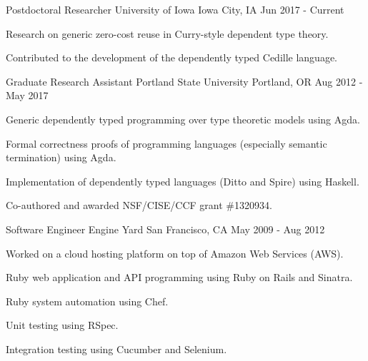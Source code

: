 

\begin{cventries}

  \cventry
    {Postdoctoral Researcher} %
    {University of Iowa} %
    {Iowa City, IA} %
    {Jun 2017 - Current} %
    {
      \begin{cvitems} %
        \item {Research on generic zero-cost reuse in Curry-style dependent type theory.}
        \item {Contributed to the development of the dependently typed Cedille language.}
      \end{cvitems}
    }

  \cventry
    {Graduate Research Assistant} %
    {Portland State University} %
    {Portland, OR} %
    {Aug 2012 - May 2017} %
    {
      \begin{cvitems} %
        \item {Generic dependently typed programming over type theoretic models using Agda.}
        \item {Formal correctness proofs of programming languages (especially semantic termination) using Agda.}
        \item {Implementation of dependently typed languages (Ditto and Spire) using Haskell.}
        \item {Co-authored and awarded NSF/CISE/CCF grant \#1320934.}
      \end{cvitems}
    }

  \cventry
    {Software Engineer} %
    {Engine Yard} %
    {San Francisco, CA} %
    {May 2009 - Aug 2012} %
    {
      \begin{cvitems} %
        \item {Worked on a cloud hosting platform on top of Amazon Web Services (AWS).}
        \item {Ruby web application and API programming using Ruby on Rails and Sinatra.}
        \item {Ruby system automation using Chef.}
        \item {Unit testing using RSpec.}
        \item {Integration testing using Cucumber and Selenium.}
      \end{cvitems}
    }


\end{cventries}
